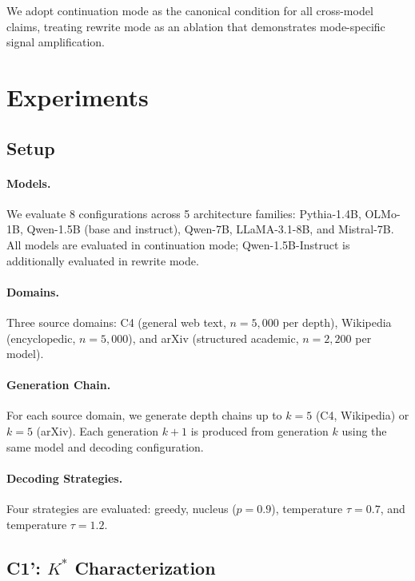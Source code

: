 \documentclass[11pt,a4paper]{article}
\begin{document}
We adopt continuation mode as the canonical condition for all cross-model claims, treating rewrite mode as an ablation that demonstrates mode-specific signal amplification.

\section{Experiments}

\subsection{Setup}

\paragraph{Models.}
We evaluate 8 configurations across 5 architecture families: Pythia-1.4B, OLMo-1B, Qwen-1.5B (base and instruct), Qwen-7B, LLaMA-3.1-8B, and Mistral-7B. All models are evaluated in continuation mode; Qwen-1.5B-Instruct is additionally evaluated in rewrite mode.

\paragraph{Domains.}
Three source domains: C4 (general web text, $n=5{,}000$ per depth), Wikipedia (encyclopedic, $n=5{,}000$), and arXiv (structured academic, $n=2{,}200$ per model).

\paragraph{Generation Chain.}
For each source domain, we generate depth chains up to $k=5$ (C4, Wikipedia) or $k=5$ (arXiv). Each generation $k+1$ is produced from generation $k$ using the same model and decoding configuration.

\paragraph{Decoding Strategies.}
Four strategies are evaluated: greedy, nucleus ($p=0.9$), temperature $\tau=0.7$, and temperature $\tau=1.2$.

\subsection{C1': $K^*$ Characterization}
\label{sec:kstar}
\end{document}
